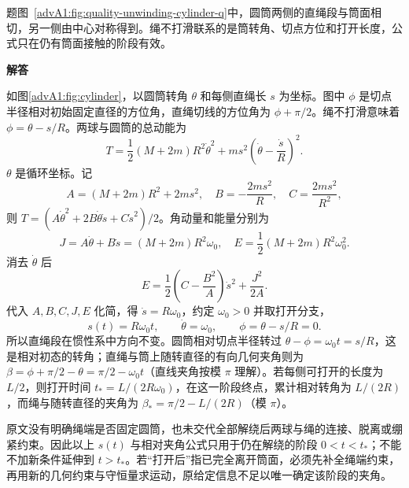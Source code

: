 \begin{advsolution}题图~\ref{advA1:fig:quality-unwinding-cylinder-q}中，圆筒两侧的直绳段与筒面相切，另一侧由中心对称得到。绳不打滑联系的是筒转角、切点方位和打开长度，公式只在仍有筒面接触的阶段有效。

\noindent\begin{minipage}{\linewidth}{\bfseries\color{DeepBlue}解答}\par
\begin{center}\begin{minipage}{\linewidth}\centering
{}
\label{advA1:fig:cylinder}
\end{minipage}\end{center}\end{minipage}

如图\ref{advA1:fig:cylinder}，以圆筒转角 $\theta$ 和每侧直绳长 $s$ 为坐标。图中 $\phi$ 是切点半径相对初始固定直径的方位角，直绳切线的方位角为 $\phi+\pi/2$。绳不打滑意味着
$\phi=\theta-s/R$。两球与圆筒的总动能为
\[
 T=\frac12(M+2m)R^2\dot\theta^2
 +ms^2\left(\dot\theta-\frac{\dot s}{R}\right)^2.
\]
$\theta$ 是循环坐标。记
\[
 A=(M+2m)R^2+2ms^2,\quad B=-\frac{2ms^2}{R},
 \quad C=\frac{2ms^2}{R^2},
\]
则 $T=(A\dot\theta^2+2B\dot\theta\dot s+C\dot s^2)/2$。角动量和能量分别为
\[
 J=A\dot\theta+B\dot s=(M+2m)R^2\omega_0,
 \quad E=\frac12(M+2m)R^2\omega_0^2.
\]
消去 $\dot\theta$ 后
\[
 E=\frac12\left(C-\frac{B^2}{A}\right)\dot s^2+\frac{J^2}{2A}.
\]
代入 $A,B,C,J,E$ 化简，得 $\dot s=R\omega_0$，约定 $\omega_0>0$ 并取打开分支，
\[
 \boxed{s(t)=R\omega_0t},\qquad \dot\theta=\omega_0,
 \qquad \phi=\theta-s/R=0.
\]
所以直绳段在惯性系中方向不变。圆筒相对切点半径转过 $\theta-\phi=\omega_0t=s/R$，这是相对初态的转角；直绳与筒上随转直径的有向几何夹角则为
$\beta=\phi+\pi/2-\theta=\pi/2-\omega_0t$（直线夹角按模 $\pi$ 理解）。若每侧可打开的长度为 $L/2$，则打开时间
$t_*=L/(2R\omega_0)$，在这一阶段终点，累计相对转角为 $L/(2R)$，而绳与随转直径的夹角为 $\beta_*=\pi/2-L/(2R)$（模 $\pi$）。

原文没有明确绳端是否固定圆筒，也未交代全部解绕后两球与绳的连接、脱离或绷紧约束。因此以上 $s(t)$ 与相对夹角公式只用于仍在解绕的阶段 $0<t<t_*$；不能不加新条件延伸到 $t>t_*$。若“打开后”指已完全离开筒面，必须先补全绳端约束，再用新的几何约束与守恒量求运动，原给定信息不足以唯一确定该阶段的夹角。
\end{advsolution}

